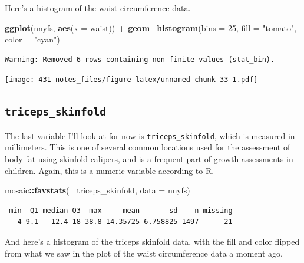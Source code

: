 \documentclass[
]{book}
\newenvironment{Shaded}{\begin{snugshade}}{\end{snugshade}}
\newcommand{\DataTypeTok}[1]{\textcolor[rgb]{0.13,0.29,0.53}{#1}}
\newcommand{\DecValTok}[1]{\textcolor[rgb]{0.00,0.00,0.81}{#1}}
\newcommand{\KeywordTok}[1]{\textcolor[rgb]{0.13,0.29,0.53}{\textbf{#1}}}
\newcommand{\NormalTok}[1]{#1}
\newcommand{\OperatorTok}[1]{\textcolor[rgb]{0.81,0.36,0.00}{\textbf{#1}}}
\newcommand{\StringTok}[1]{\textcolor[rgb]{0.31,0.60,0.02}{#1}}
\begin{document}
Here's a histogram of the waist circumference data.

\begin{Shaded}
\begin{Highlighting}[]
\KeywordTok{ggplot}\NormalTok{(nnyfs, }\KeywordTok{aes}\NormalTok{(}\DataTypeTok{x =}\NormalTok{ waist)) }\OperatorTok{+}
\StringTok{  }\KeywordTok{geom_histogram}\NormalTok{(}\DataTypeTok{bins =} \DecValTok{25}\NormalTok{, }\DataTypeTok{fill =} \StringTok{"tomato"}\NormalTok{, }\DataTypeTok{color =} \StringTok{"cyan"}\NormalTok{)}
\end{Highlighting}
\end{Shaded}

\begin{verbatim}
Warning: Removed 6 rows containing non-finite values (stat_bin).
\end{verbatim}

\texttt{[image: 431-notes\_files/figure-latex/unnamed-chunk-33-1.pdf]}

\hypertarget{triceps_skinfold}{%
\subsection{\texorpdfstring{\texttt{triceps\_skinfold}}{triceps\_skinfold}}\label{triceps_skinfold}}

The last variable I'll look at for now is \texttt{triceps\_skinfold}, which is measured in millimeters. This is one of several common locations used for the assessment of body fat using skinfold calipers, and is a frequent part of growth assessments in children. Again, this is a numeric variable according to R.

\begin{Shaded}
\begin{Highlighting}[]
\NormalTok{mosaic}\OperatorTok{::}\KeywordTok{favstats}\NormalTok{(}\OperatorTok{~}\StringTok{ }\NormalTok{triceps_skinfold, }\DataTypeTok{data =}\NormalTok{ nnyfs)}
\end{Highlighting}
\end{Shaded}

\begin{verbatim}
 min  Q1 median Q3  max     mean       sd    n missing
   4 9.1   12.4 18 38.8 14.35725 6.758825 1497      21
\end{verbatim}

And here's a histogram of the triceps skinfold data, with the fill and color flipped from what we saw in the plot of the waist circumference data a moment ago.
\end{document}
